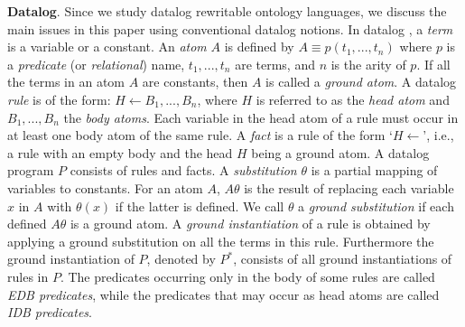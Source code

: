 \documentclass{article}
\begin{document}
\textbf{Datalog}. Since we study datalog rewritable ontology
languages, we discuss the main issues in this paper using
conventional datalog notions.
In datalog \cite{database}, a \emph{term} is a variable or a constant. An \emph{atom} $A$ is defined by $A\equiv p(t_1,...,t_n)$ where $p$ is a \emph{predicate} (or \emph{relational}) name, $t_1,...,t_n$ are terms, and $n$ is the arity of $p$. If all the terms in an atom $A$ are constants, then $A$ is called a \emph{ground atom}.
A datalog \emph{rule} is of the form: $ H\leftarrow B_1,...,B_n$, where $H$ is referred to as the \emph{head atom} and $B_1,...,B_n$ the \emph{body atoms}. Each variable in the head atom of a rule must occur in at least one body atom of the same rule. A \emph{fact} is a rule of the form `$H\leftarrow$', i.e., a rule with an empty body and the head $H$ being a ground atom. A datalog program $P$ consists of rules and facts.
A \emph{substitution} $\theta$ is a partial mapping of variables to constants. For an atom $A$, $A\theta$ is the result of replacing each variable $x$ in $A$ with $\theta(x)$ if the latter is defined. We call $\theta$ a \emph{ground substitution} if each defined $A\theta$ is a ground atom. A \emph{ground instantiation} of a rule is obtained by applying a ground substitution on all the terms in this rule. Furthermore the ground instantiation of $P$, denoted by $P^*$, consists of all ground instantiations of rules in $P$. The predicates occurring only in the body of some rules are called \emph{EDB predicates}, while the predicates that may occur as head atoms are called \emph{IDB predicates}.
\end{document}
